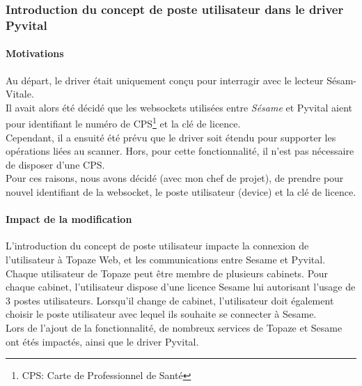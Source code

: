 		
\subsubsection{Introduction du concept de poste utilisateur dans le driver Pyvital}
\paragraph*{Motivations\\}
Au départ, le driver était uniquement conçu pour interragir avec le lecteur Sésam-Vitale.\\ Il avait alors été décidé que les websockets utilisées entre \textit{Sésame} et Pyvital aient pour identifiant le numéro de CPS\footnote{CPS: Carte de Professionnel de Santé} et la clé de licence.\\
Cependant, il a ensuité été prévu que le driver soit étendu pour supporter les opérations liées au scanner. Hors, pour cette fonctionnalité, il n'est pas nécessaire de disposer d'une CPS.\\
Pour ces raisons, nous avons décidé (avec mon chef de projet), de prendre pour nouvel identifiant de la websocket, le poste utilisateur (device) et la clé de licence. 

\paragraph*{Impact de la modification\\}
L'introduction du concept de poste utilisateur impacte la connexion de l'utilisateur à Topaze Web, et les communications entre Sesame et Pyvital.\\
Chaque utilisateur de Topaze peut être membre de plusieurs cabinets. Pour chaque cabinet, l'utilisateur dispose d'une licence Sesame lui autorisant l'usage de 3 postes utilisateurs. Lorsqu'il change de cabinet, l'utilisateur doit également choisir le poste utilisateur avec lequel ils souhaite se connecter à Sesame.\\

Lors de l'ajout de la fonctionnalité, de nombreux services de Topaze et Sesame ont étés impactés, ainsi que le driver Pyvital.

